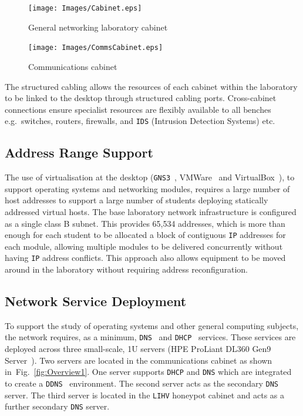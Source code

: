\documentclass[10pt,journal]{IEEEtran}
\begin{document}
\begin{figure}[ht]
  \centering
  \begin{minipage}[ht]{0.45\textwidth}
    \texttt{[image: Images/Cabinet.eps]}
    \caption{General networking laboratory cabinet\label{fig:Cabinet}}
  \end{minipage}
\end{figure}

\begin{figure}[ht]
  \centering
  \begin{minipage}[ht]{0.45\textwidth}
    \texttt{[image: Images/CommsCabinet.eps]}
    \caption{Communications cabinet\label{fig:CommsCabinet}}
  \end{minipage}
\end{figure}

The structured cabling allows the resources of each cabinet within the
laboratory to be linked to the desktop through structured cabling ports.
Cross-cabinet connections ensure specialist resources are flexibly available to
all benches e.g.\ switches, routers, firewalls, and \texttt{IDS} (Intrusion
Detection Systems) etc.

\subsection{Address Range Support}

The use of virtualisation at the desktop (\texttt{GNS3}~\cite{GNS3:17},
VMWare~\cite{VMWARE:17} and VirtualBox~\cite{O:17}), to support operating
systems and networking modules, requires a large number of host addresses to
support a large number of students deploying statically addressed virtual
hosts. The base laboratory network infrastructure is configured as a single
class B subnet.  This provides 65,534 addresses, which is more than enough for
each student to be allocated a block of contiguous \texttt{IP} addresses for
each module, allowing multiple modules to be delivered concurrently without
having \texttt{IP} address conflicts.  This approach also allows equipment to
be moved around in the laboratory without requiring address reconfiguration.

\subsection{Network Service Deployment}\label{InfraService}

To support the study of operating systems and other general computing subjects,
the network requires, as a minimum, \texttt{DNS}~\cite{RA:11} and
\texttt{DHCP}~\cite{DL:02} services. These services are deployed across three
small-scale, 1U servers (HPE ProLiant DL360 Gen9 Server~\cite{HPE:17}). Two
servers are located in the communications cabinet as shown
in~Fig.~\ref{fig:Overview1}. One server supports \texttt{DHCP} and \texttt{DNS}
which are integrated to create a \texttt{DDNS}~\cite{SV:06} environment. The
second server acts as the secondary \texttt{DNS} server. The third server is
located in the \texttt{LIHV} honeypot cabinet and acts as a further secondary
\texttt{DNS} server.
\end{document}
